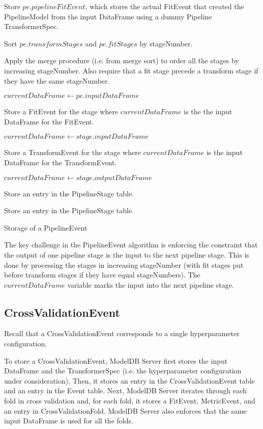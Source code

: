 \begin{algorithm}[H]
 Store $pe.pipelineFitEvent$, which stores the actual FitEvent that created the
 PipelineModel from the input DataFrame using a dummy Pipeline TransformerSpec.

 Sort $pe.transformStages$ and $pe.fitStages$ by stageNumber.

 Apply the merge procedure (i.e. from merge sort) to order all the stages by
 increasing stageNumber. Also require that a fit stage precede a transform stage
 if they have the same stageNumber.

 $currentDataFrame \gets pe.inputDataFrame$ 

  {
    {
     Store a FitEvent for the stage where $currentDataFrame$ is the the input DataFrame
     for the FitEvent.

     $currentDataFrame \gets stage.inputDataFrame$
   } {
     Store a TransformEvent for the stage where $currentDataFrame$ is the input DataFrame
     for the TransformEvent.

     $currentDataFrame \gets stage.outputDataFrame$
   }
 }

  {
   Store an entry in the PipelineStage table.
 }

  {
   Store an entry in the PipelineStage table.
 }

 \caption{Storage of a PipelineEvent}
\end{algorithm}

The key challenge in the PipelineEvent algorithm is enforcing the constraint that
the output of one pipeline stage is the input to the next pipeline stage. This is
done by processing the stages in increasing stageNumber (with fit stages put before
transform stages if they have equal stageNumbers). The $currentDataFrame$ variable
marks the input into the next pipeline stage.

\subsection{CrossValidationEvent}
Recall that a CrossValidationEvent corresponds to a single hyperparameter configuration.

To store a CrossValidationEvent, ModelDB Server first stores the input DataFrame and the
TransformerSpec (i.e. the hyperparameter configuration under consideration). Then, it
stores an entry in the CrossValidationEvent table and an entry in the Event table. Next,
ModelDB Server iterates through each fold in cross validation and, for each fold, it 
stores a FitEvent, MetricEvent, and an entry in CrossValidationFold. ModelDB Server also
enforces that the same input DataFrame is used for all the folds.

